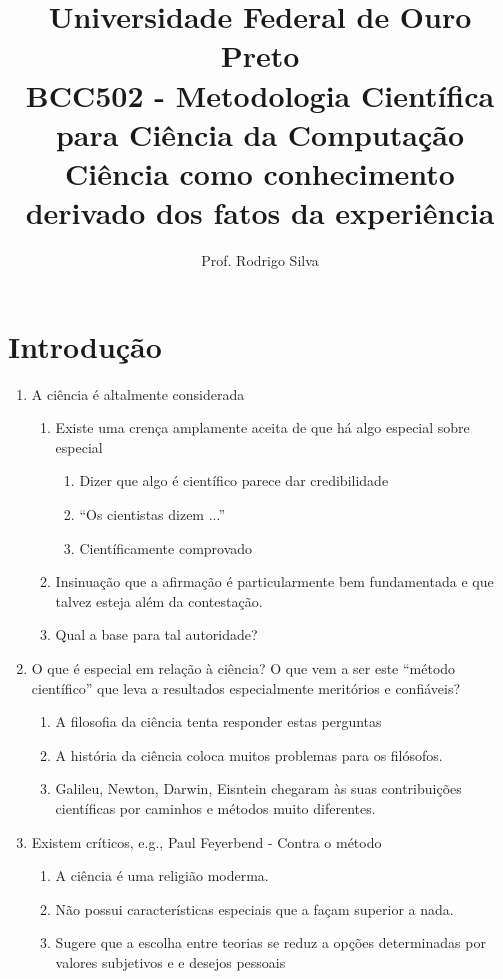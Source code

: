 \documentclass{article}
\title{\vspace{-2 cm}Universidade Federal de Ouro Preto \\ BCC502 - Metodologia Científica para Ciência da Computação \\\textbf{ Ciência como conhecimento derivado dos fatos da experiência}}
\author{Prof. Rodrigo Silva}
\date{}
\begin{document}
\maketitle

\section{Introdução}

\begin{enumerate}
    \item A ciência é altalmente considerada
    \begin{enumerate}
        \item Existe uma crença amplamente aceita de que há algo especial sobre especial
        \begin{enumerate}
            \item Dizer que algo é científico parece dar credibilidade
            \item ``Os cientistas dizem ...''
            \item Científicamente comprovado
        \end{enumerate}
        \item Insinuação que a afirmação é particularmente bem fundamentada e que talvez esteja além da contestação.
        \item Qual a base para tal autoridade? 
    \end{enumerate}
    \item O que é especial em relação à ciência? O que vem a ser este ``método científico'' que leva a resultados especialmente meritórios e confiáveis?
    \begin{enumerate}
        \item A filosofia da ciência tenta responder estas perguntas
        \item A história da ciência coloca muitos problemas para os filósofos. 
        \item Galileu, Newton, Darwin, Eisntein chegaram às suas contribuições científicas por caminhos e métodos muito diferentes.
    \end{enumerate}
    \item Existem críticos, e.g., Paul Feyerbend - Contra o método
    \begin{enumerate}
        \item A ciência é uma religião moderma. 
        \item Não possui características especiais que a façam superior a nada.
        \item Sugere que a escolha entre teorias se reduz a opções determinadas por valores subjetivos e e desejos pessoais 

\end{enumerate}
\end{enumerate}
\end{document}
